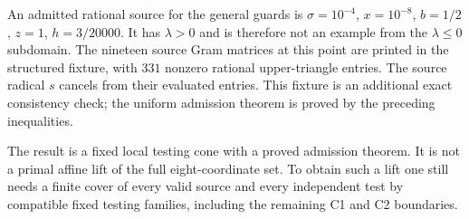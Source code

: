 An admitted rational source for the general guards is
$\sigma=10^{-4}$, $x=10^{-8}$, $b=1/2$, $z=1$, $h=3/20000$.
It has $\lambda>0$ and is therefore not an example from the
$\lambda\le0$ subdomain. The nineteen source Gram matrices at
this point are printed in the structured fixture, with $331$
nonzero rational upper-triangle entries. The source radical
$s$ cancels from their evaluated entries. This fixture is an
additional exact consistency check; the uniform admission theorem
is proved by the preceding inequalities.

The result is a fixed local testing cone with a proved admission
theorem. It is not a primal affine lift of the full eight-coordinate
set. To obtain such a lift one still needs a finite cover of every
valid source and every independent test by compatible fixed testing
families, including the remaining C1 and C2 boundaries.
